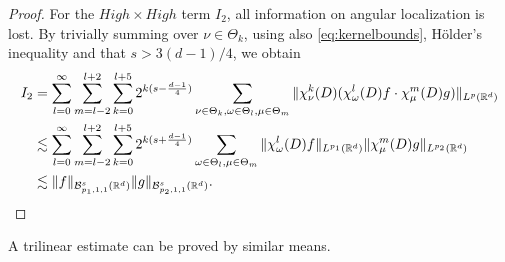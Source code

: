 \documentclass{amsart}
\theoremstyle{definition}
\newcommand {\Rd}{\mathbb{R}^{d}}
\newcommand {\w}{\omega}
\newcommand {\Ba}{\mathcal{B}}
\numberwithin{equation}{section}
\begin{document}
\begin{proof}
For the $High \times High$ term $I_{2}$, all information on angular localization is lost. By trivially summing over $\nu\in\Theta_{k}$, using also \eqref{eq:kernelbounds}, H\"{o}lder's inequality and that $s >3(d-1)/4$, we obtain
\begin{align*}
I_{2}&=\sum_{l=0}^{\infty}\sum_{m=l-2}^{l+2}\sum_{k=0}^{l+5} 2^{k(s- \frac{d-1}{4})}\sum_{\nu\in\Theta_{k},\w\in\Theta_{l},\mu\in\Theta_{m}}\|\chi_{\nu}^{k}(D)(\chi_{\w}^{l}(D)f \cdot \chi_{\mu}^{m}(D)g)\|_{L^p(\Rd)}\\
&\lesssim \sum_{l=0}^{\infty}\sum_{m=l-2}^{l+2}\sum_{k=0}^{l+5} 2^{k(s+\frac{d-1}{4})} \sum_{\w\in\Theta_{l},\mu\in\Theta_{m}}\|\chi_{\w}^{l}(D)f\|_{L^{p_{1}}(\Rd)}\|\chi_{\mu}^{m}(D)g\|_{L^{p_{2}}(\Rd)}\\
&\lesssim \|f\|_{\Ba^{s}_{p_{1},1,1}(\Rd)}\|g\|_{\Ba^{s}_{p_{2},1,1}(\Rd)}.\qedhere
\end{align*}
\end{proof}

A trilinear estimate can be proved by similar means.
\end{document}
